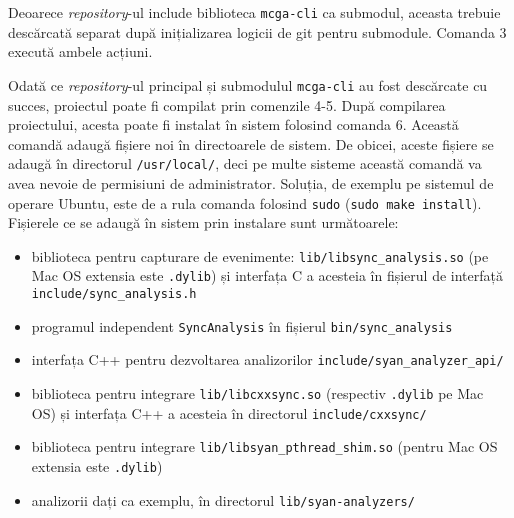 Deoarece \textit{repository}-ul include biblioteca
\lstinline{mcga-cli}\cite{mcga-cli} ca submodul, aceasta trebuie
descărcată separat după inițializarea logicii de git pentru submodule.
Comanda 3 execută ambele acțiuni.

Odată ce \textit{repository}-ul principal și submodulul
\lstinline{mcga-cli} au fost descărcate cu succes, proiectul poate fi
compilat prin comenzile 4-5. După compilarea proiectului, acesta poate
fi instalat în sistem folosind comanda 6. Această comandă adaugă fișiere
noi în directoarele de sistem. De obicei, aceste fișiere se adaugă în
directorul \lstinline{/usr/local/}, deci pe multe sisteme această
comandă va avea nevoie de permisiuni de administrator. Soluția, de
exemplu pe sistemul de operare Ubuntu, este de a rula comanda folosind
\lstinline{sudo} (\lstinline{sudo make install}). Fișierele ce se adaugă
în sistem prin instalare sunt următoarele:

\begin{itemize}
    \item biblioteca pentru capturare de evenimente:
    \lstinline{lib/libsync_analysis.so} (pe Mac OS extensia este
    \lstinline{.dylib}) și interfața C a acesteia în fișierul de
    interfață \lstinline{include/sync_analysis.h}
    \item programul independent \lstinline{SyncAnalysis} în fișierul
    \lstinline{bin/sync_analysis}
    \item interfața C++ pentru dezvoltarea analizorilor
    \lstinline{include/syan_analyzer_api/}
    \item biblioteca pentru integrare \lstinline{lib/libcxxsync.so}
    (respectiv \lstinline{.dylib} pe Mac OS) și interfața C++ a
    acesteia în directorul \lstinline{include/cxxsync/}
    \item biblioteca pentru integrare
    \lstinline{lib/libsyan_pthread_shim.so} (pentru Mac OS extensia este
    \lstinline{.dylib})
    \item analizorii dați ca exemplu, în directorul
    \lstinline{lib/syan-analyzers/}
\end{itemize}
